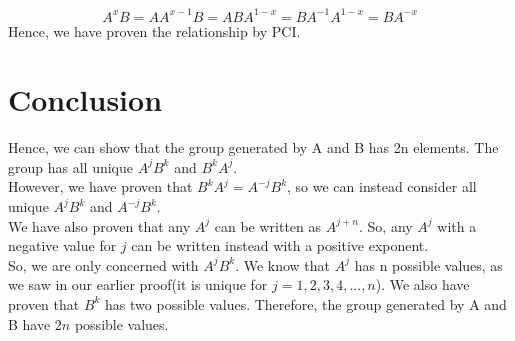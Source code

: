 \documentclass[12pt]{article}
\begin{document}
\[
	A^xB = AA^{x-1}B = ABA^{1-x} = BA^{-1}A^{1-x} = BA^{-x}
\]
Hence, we have proven the relationship by PCI.

\section*{Conclusion}

Hence, we can show that the group generated by A and B has 2n elements. The group has all unique $A^jB^k$ and $B^kA^j$. \\
However, we have proven that $B^kA^j = A^{-j}B^k$, so we can instead consider all unique $A^jB^k$ and $A^{-j}B^k$. \\
We have also proven that any $A^j$ can be written as $A^{j+n}$. So, any $A^j$ with a negative value for $j$ can be written instead with a positive exponent. \\
So, we are only concerned with $A^jB^k$. We know that $A^j$ has n possible values, as we saw in our earlier proof(it is unique for $j = 1,2,3,4,...,n$). We also have proven that $B^k$ has two possible values. Therefore, the group generated by A and B have $2n$ possible values.



	
\end{document}
